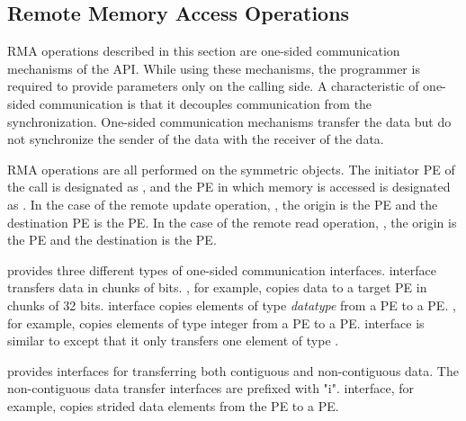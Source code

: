 \subsection{Remote Memory Access Operations}
\label{sec:rma}
\ac{RMA} operations described in this section are one-sided communication
mechanisms of the \openshmem{} \ac{API}. While 
using these mechanisms, the programmer is required to provide parameters
only on the calling side. A characteristic of one-sided communication 
is that it decouples communication from
the synchronization. One-sided communication mechanisms transfer 
the data but do not synchronize the sender of the data with the receiver
of the data. 

\openshmem{} \ac{RMA} operations are all performed on the symmetric objects. 
The initiator \ac{PE} of the call is designated as \source{}, and the 
\ac{PE} in which memory is accessed is designated as \target{}. In the case of the remote
update operation, \PUT{}, the origin is the \source{} \ac{PE} and the 
destination \ac{PE} is the \target{} PE. In the case of the remote read operation, \GET{}, 
the origin is the \target{} \ac{PE} and the destination is the \source{} \ac{PE}.

\openshmem{} provides three different types of one-sided communication interfaces. 
 interface transfers data in chunks 
of bits. , for example, copies data to a target \ac{PE} in chunks of 
32 bits.  interface copies elements of type 
\textit{datatype} from a \source{} \ac{PE} to a \target{} \ac{PE}. 
, for example, copies elements
of type integer from a \source{} \ac{PE} to a \target{} \ac{PE}. 
 interface is similar to  
except that it only transfers one element of type .

\openshmem{} provides interfaces for transferring both contiguous and 
non-contiguous data. The non-contiguous data transfer interfaces are prefixed 
with "i".  interface, for example, copies strided
data elements from the \source{} \ac{PE} to a \target{} \ac{PE}. 


